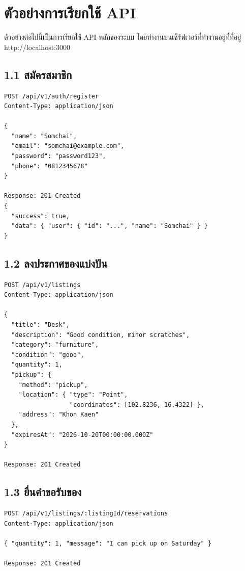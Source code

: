 \documentclass[12pt,a4paper]{report}
\newcommand{\chapterthainame}{บทที่}
\renewcommand{\cftchappresnum}{บทที่ }
\begin{document}
\appendix
\renewcommand{\chapterthainame}{ภาคผนวก}
\addtocontents{toc}{\protect\renewcommand{\protect\cftchappresnum}{ภาคผนวก~}}
\chapter{ตัวอย่างการเรียกใช้ API}

ตัวอย่างต่อไปนี้เป็นการเรียกใช้ API หลักของระบบ โดยทำงานบนเซิร์ฟเวอร์ที่ทำงานอยู่ที่ที่อยู่ http://localhost:3000

\noindent\begin{minipage}{\linewidth}
\section*{1.1 สมัครสมาชิก}

\begin{lstlisting}
POST /api/v1/auth/register
Content-Type: application/json

{
  "name": "Somchai",
  "email": "somchai@example.com",
  "password": "password123",
  "phone": "0812345678"
}

Response: 201 Created
{
  "success": true,
  "data": { "user": { "id": "...", "name": "Somchai" } }
}
\end{lstlisting}
\end{minipage}

\noindent\begin{minipage}{\linewidth}
\section*{1.2 ลงประกาศของแบ่งปัน}

\begin{lstlisting}
POST /api/v1/listings
Content-Type: application/json

{
  "title": "Desk",
  "description": "Good condition, minor scratches",
  "category": "furniture",
  "condition": "good",
  "quantity": 1,
  "pickup": {
    "method": "pickup",
    "location": { "type": "Point",
                  "coordinates": [102.8236, 16.4322] },
    "address": "Khon Kaen"
  },
  "expiresAt": "2026-10-20T00:00:00.000Z"
}

Response: 201 Created
\end{lstlisting}
\end{minipage}

\noindent\begin{minipage}{\linewidth}
\section*{1.3 ยื่นคำขอรับของ}

\begin{lstlisting}
POST /api/v1/listings/:listingId/reservations
Content-Type: application/json

{ "quantity": 1, "message": "I can pick up on Saturday" }

Response: 201 Created
\end{lstlisting}
\end{minipage}
\end{document}
